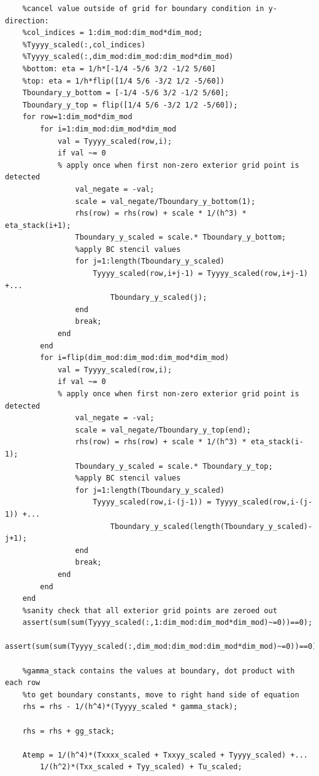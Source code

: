 \documentclass[12pt,letter]{article}
\begin{document}
\begin{enumerate}
\begin{enumerate}
\begin{verbatim}
    %cancel value outside of grid for boundary condition in y-direction:
    %col_indices = 1:dim_mod:dim_mod*dim_mod;
    %Tyyyy_scaled(:,col_indices)
    %Tyyyy_scaled(:,dim_mod:dim_mod:dim_mod*dim_mod)
    %bottom: eta = 1/h*[-1/4 -5/6 3/2 -1/2 5/60]
    %top: eta = 1/h*flip([1/4 5/6 -3/2 1/2 -5/60])
    Tboundary_y_bottom = [-1/4 -5/6 3/2 -1/2 5/60];
    Tboundary_y_top = flip([1/4 5/6 -3/2 1/2 -5/60]);
    for row=1:dim_mod*dim_mod
        for i=1:dim_mod:dim_mod*dim_mod
            val = Tyyyy_scaled(row,i);
            if val ~= 0
            % apply once when first non-zero exterior grid point is detected
                val_negate = -val;
                scale = val_negate/Tboundary_y_bottom(1);
                rhs(row) = rhs(row) + scale * 1/(h^3) * eta_stack(i+1); 
                Tboundary_y_scaled = scale.* Tboundary_y_bottom;
                %apply BC stencil values
                for j=1:length(Tboundary_y_scaled)
                    Tyyyy_scaled(row,i+j-1) = Tyyyy_scaled(row,i+j-1) +...
                        Tboundary_y_scaled(j);
                end
                break; 
            end
        end
        for i=flip(dim_mod:dim_mod:dim_mod*dim_mod)
            val = Tyyyy_scaled(row,i);
            if val ~= 0
            % apply once when first non-zero exterior grid point is detected
                val_negate = -val;
                scale = val_negate/Tboundary_y_top(end);
                rhs(row) = rhs(row) + scale * 1/(h^3) * eta_stack(i-1);
                Tboundary_y_scaled = scale.* Tboundary_y_top;
                %apply BC stencil values
                for j=1:length(Tboundary_y_scaled)
                    Tyyyy_scaled(row,i-(j-1)) = Tyyyy_scaled(row,i-(j-1)) +...
                        Tboundary_y_scaled(length(Tboundary_y_scaled)-j+1);
                end
                break;
            end
        end
    end
    %sanity check that all exterior grid points are zeroed out
    assert(sum(sum(Tyyyy_scaled(:,1:dim_mod:dim_mod*dim_mod)~=0))==0);
    assert(sum(sum(Tyyyy_scaled(:,dim_mod:dim_mod:dim_mod*dim_mod)~=0))==0);
    
    %gamma_stack contains the values at boundary, dot product with each row
    %to get boundary constants, move to right hand side of equation
    rhs = rhs - 1/(h^4)*(Tyyyy_scaled * gamma_stack);
    
    rhs = rhs + gg_stack;
    
    Atemp = 1/(h^4)*(Txxxx_scaled + Txxyy_scaled + Tyyyy_scaled) +...
        1/(h^2)*(Txx_scaled + Tyy_scaled) + Tu_scaled;
    

\end{verbatim}
\end{enumerate}
\end{enumerate}
\end{document}
